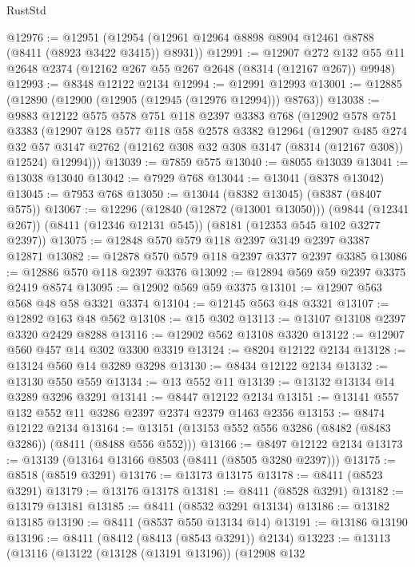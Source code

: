\begin{lexlean}{RustStd}
\begin{coremodule}
@12976 := @12951 (@12954 (@12961 @12964 @8898 @8904 @12461 @8788 (@8411 (@8923 @3422 @3415)) @8931))
@12991 := @12907
    @272
    @132
    @55
    @11
    @2648
    @2374
    (@12162 @267 @55 @267 @2648 (@8314 (@12167 @267)) @9948)
@12993 := @8348 @12122 @2134
@12994 := @12991 @12993
@13001 := @12885 (@12890 (@12900 (@12905 (@12945 (@12976 @12994))) @8763))
@13038 := @9883
    @12122
    @575
    @578
    @751
    @118
    @2397
    @3383
    @768
    (@12902
      @578
      @751
      @3383
      (@12907
        @128
        @577
        @118
        @58
        @2578
        @3382
        @12964
        (@12907
          @485
          @274
          @32
          @57
          @3147
          @2762
          (@12162 @308 @32 @308 @3147 (@8314 (@12167 @308)) @12524)
          @12994)))
@13039 := @7859 @575
@13040 := @8055 @13039
@13041 := @13038 @13040
@13042 := @7929 @768
@13044 := @13041 (@8378 @13042)
@13045 := @7953 @768
@13050 := @13044 (@8382 @13045) (@8387 (@8407 @575))
@13067 := @12296
    (@12840 (@12872 (@13001 @13050)))
    (@9844 (@12341 @267))
    (@8411 (@12346 @12131 @545))
    (@8181 (@12353 @545 @102 @3277 @2397))
@13075 := @12848 @570 @579 @118 @2397 @3149 @2397 @3387 @12871
@13082 := @12878 @570 @579 @118 @2397 @3377 @2397 @3385
@13086 := @12886 @570 @118 @2397 @3376
@13092 := @12894 @569 @59 @2397 @3375 @2419 @8574
@13095 := @12902 @569 @59 @3375
@13101 := @12907 @563 @568 @48 @58 @3321 @3374
@13104 := @12145 @563 @48 @3321
@13107 := @12892 @163 @48 @562
@13108 := @15 @302
@13113 := @13107 @13108 @2397 @3320 @2429 @8288
@13116 := @12902 @562 @13108 @3320
@13122 := @12907 @560 @457 @14 @302 @3300 @3319
@13124 := @8204 @12122 @2134
@13128 := @13124 @560 @14 @3289 @3298
@13130 := @8434 @12122 @2134
@13132 := @13130 @550 @559
@13134 := @13 @552 @11
@13139 := @13132 @13134 @14 @3289 @3296 @3291
@13141 := @8447 @12122 @2134
@13151 := @13141 @557 @132 @552 @11 @3286 @2397 @2374 @2379 @1463 @2356
@13153 := @8474 @12122 @2134
@13164 := @13151 (@13153 @552 @556 @3286 (@8482 (@8483 @3286)) (@8411 (@8488 @556 @552)))
@13166 := @8497 @12122 @2134
@13173 := @13139 (@13164 @13166 @8503 (@8411 (@8505 @3280 @2397)))
@13175 := @8518 (@8519 @3291)
@13176 := @13173 @13175
@13178 := @8411 (@8523 @3291)
@13179 := @13176 @13178
@13181 := @8411 (@8528 @3291)
@13182 := @13179 @13181
@13185 := @8411 (@8532 @3291 @13134)
@13186 := @13182 @13185
@13190 := @8411 (@8537 @550 @13134 @14)
@13191 := @13186 @13190
@13196 := @8411 (@8412 (@8413 (@8543 @3291)) @2134)
@13223 := @13113
    (@13116
      (@13122
        (@13128 (@13191 @13196))
        (@12908
          @132

\end{coremodule}
\end{lexlean}
